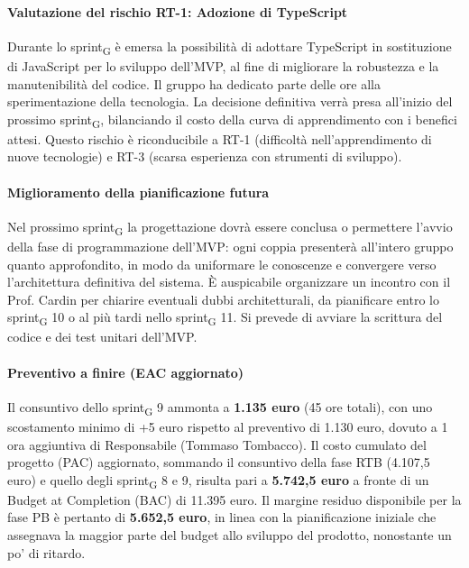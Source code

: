 \documentclass[11pt,a4paper]{article}
\newcommand{\gls}[1]{#1\textsubscript{G}}
\begin{document}
\paragraph{Valutazione del rischio RT-1: Adozione di TypeScript}
Durante lo \gls{sprint} è emersa la possibilità di adottare TypeScript in sostituzione di JavaScript per lo sviluppo dell'MVP, al fine di migliorare la robustezza e la manutenibilità del codice. Il gruppo ha dedicato parte delle ore alla sperimentazione della tecnologia. La decisione definitiva verrà presa all'inizio del prossimo \gls{sprint}, bilanciando il costo della curva di apprendimento con i benefici attesi. Questo rischio è riconducibile a RT-1 (difficoltà nell'apprendimento di nuove tecnologie) e RT-3 (scarsa esperienza con strumenti di sviluppo).
 
\paragraph{Miglioramento della pianificazione futura}
Nel prossimo \gls{sprint} la progettazione dovrà essere conclusa o permettere l'avvio della fase di programmazione dell'MVP: ogni coppia presenterà all'intero gruppo quanto approfondito, in modo da uniformare le conoscenze e convergere verso l'architettura definitiva del sistema. È auspicabile organizzare un incontro con il Prof. Cardin per chiarire eventuali dubbi architetturali, da pianificare entro lo \gls{sprint} 10 o al più tardi nello \gls{sprint} 11. Si prevede di avviare la scrittura del codice e dei test unitari dell'MVP.
 
\paragraph{Preventivo a finire (EAC aggiornato)}
Il consuntivo dello \gls{sprint} 9 ammonta a \textbf{1.135 euro} (45 ore totali), con uno scostamento minimo di +5 euro rispetto al preventivo di 1.130 euro, dovuto a 1 ora aggiuntiva di Responsabile (Tommaso Tombacco).
Il costo cumulato del progetto (PAC) aggiornato, sommando il consuntivo della fase RTB (4.107,5 euro) e quello degli \gls{sprint} 8 e 9, risulta pari a \textbf{5.742,5 euro} a fronte di un Budget at Completion (BAC) di 11.395 euro. Il margine residuo disponibile per la fase PB è pertanto di \textbf{5.652,5 euro}, in linea con la pianificazione iniziale che assegnava la maggior parte del budget allo sviluppo del prodotto, nonostante un po' di ritardo.

\newpage
\end{document}
